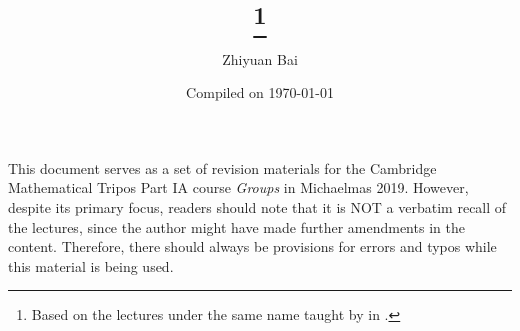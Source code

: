 \documentclass[a4paper]{article}
\title{\triposcourse{}
\thanks{Based on the lectures under the same name taught by \triposlecturer{} in \triposterm{}.}}
\author{Zhiyuan Bai}
\date{Compiled on \today}
\newcommand{\triposcourse}{Groups}
\newcommand{\triposterm}{Michaelmas 2019}
\newcommand{\tripospart}{IA}
\theoremstyle{plain}
\theoremstyle{definition}
\theoremstyle{remark}
\begin{document}
    \maketitle
    This document serves as a set of revision materials for the Cambridge Mathematical Tripos Part \tripospart{} course \textit{\triposcourse{}} in \triposterm{}.
    However, despite its primary focus, readers should note that it is NOT a verbatim recall of the lectures, since the author might have made further amendments in the content.
    Therefore, there should always be provisions for errors and typos while this material is being used.
    \tableofcontents
    
    
    
    
    
    
    
    
    
    
    
    
\end{document}
